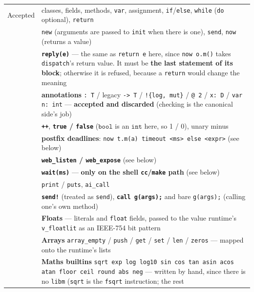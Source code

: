 \documentclass[11pt,a4paper]{article}
\newcommand{\ty}[1]{\ensuremath{\mathtt{#1}}}
\begin{document}
\begin{center}
\small
\begin{tabular}{@{}p{20mm}p{102mm}@{}}
\toprule
Accepted & classes, fields, methods, \texttt{var}, assignment,
       \texttt{if}/\texttt{else}, \texttt{while} (\texttt{do} optional),
       \texttt{return} \\
     & \texttt{new} (arguments are passed to \texttt{init} when there is one),
       \texttt{send}, \texttt{now} (returns a value) \\
     & \textbf{\texttt{reply(e)}} --- the same as \texttt{return e} here, since
       \texttt{now o.m()} takes \texttt{dispatch}'s return value. It must be
       \textbf{the last statement of its block}; otherwise it is refused,
       because a \texttt{return} would change the meaning \\
     & \textbf{annotations} \texttt{: T} / legacy \texttt{-> T} /
       \texttt{!\{log, mut\}} / \texttt{@ 2} / \texttt{x: D} /
       \texttt{var n: int} --- \textbf{accepted and discarded} (checking is the
       canonical side's job) \\
     & \textbf{\texttt{++}}, \textbf{\texttt{true} / \texttt{false}}
       (\ty{bool} is an \ty{int} here, so 1 / 0), unary minus \\
     & \textbf{postfix deadlines}:
       \texttt{now t.m(a) timeout <ms> else <expr>} (see below) \\
     & \textbf{\texttt{web\_listen} / \texttt{web\_expose}} (see below) \\
     & \textbf{\texttt{wait(ms)}} --- \textbf{only on the shell
       \texttt{cc}/\texttt{make} path} (see below) \\
     & \texttt{print} / \texttt{puts}, \texttt{ai\_call} \\
     & \textbf{\texttt{send!}} (treated as \texttt{send}), \textbf{\texttt{call g(args);}}
       and bare \texttt{g(args);} (calling one's own method) \\
     & \textbf{Floats} --- literals and \texttt{float} fields, passed to the value
       runtime's \texttt{v\_floatlit} as an IEEE-754 bit pattern \\
     & \textbf{Arrays} \texttt{array\_empty} / \texttt{push} / \texttt{get} /
       \texttt{set} / \texttt{len} / \texttt{zeros} --- mapped onto the runtime's lists \\
     & \textbf{Maths builtins} \texttt{sqrt exp log log10 sin cos tan asin acos
       atan floor ceil round abs neg} --- written by hand, since there is no
       \texttt{libm} (\texttt{sqrt} is the \texttt{fsqrt} instruction; the rest

\end{tabular}
\end{center}
\end{document}
